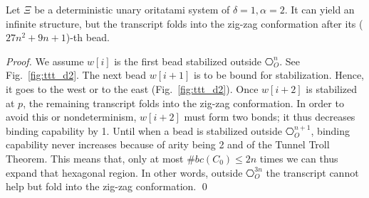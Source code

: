 \begin{theorem}[$\delta= 1, \alpha=2$]
Let $\Xi$ be a deterministic unary oritatami system of $\delta = 1, \alpha = 2$.
It can yield an infinite structure, but the transcript folds into the zig-zag conformation after its ($27n^2 + 9n +1$)-th bead.
\end{theorem}

\begin{proof}
 We assume $w[i]$ is the first bead stabilized outside $\hexagon^n_O$.
 See Fig.~\ref{fig:ttt_d2}.
 The next bead $w[i+1]$ is to be bound for stabilization.
 Hence, it goes to the west  or to the east (Fig.~\ref{fig:ttt_d2}).
 Once $w[i+2]$ is stabilized at $p$, the remaining transcript folds into the zig-zag conformation.
 In order to avoid this or nondeterminism, $w[i+2]$ must form two bonds; it thus decreases binding capability by 1.
 Until when a bead is stabilized outside $\hexagon^{n+1}_O$, binding capability never increases because of arity being 2 and of the Tunnel Troll Theorem.
 This means that, only at most $\#bc(C_0) \leq 2n$ times we can thus expand that hexagonal region.
 In other words, outside $\hexagon^{3n}_O$ the transcript cannot help but fold into the zig-zag conformation. \qed
 
\end{proof}
